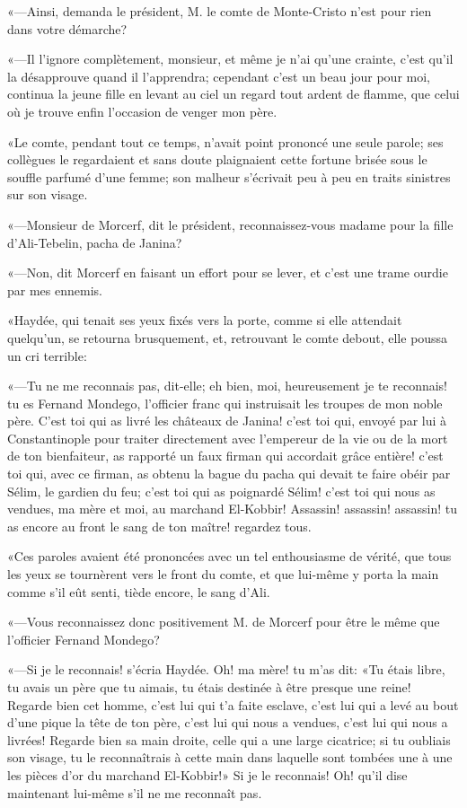 «—Ainsi, demanda le président, M. le comte de Monte-Cristo n'est pour rien dans votre démarche? 

«—Il l'ignore complètement, monsieur, et même je n'ai qu'une crainte, c'est qu'il la désapprouve quand il l'apprendra; cependant c'est un beau jour pour moi, continua la jeune fille en levant au ciel un regard tout ardent de flamme, que celui où je trouve enfin l'occasion de venger mon père. 

«Le comte, pendant tout ce temps, n'avait point prononcé une seule parole; ses collègues le regardaient et sans doute plaignaient cette fortune brisée sous le souffle parfumé d'une femme; son malheur s'écrivait peu à peu en traits sinistres sur son visage. 

«—Monsieur de Morcerf, dit le président, reconnaissez-vous madame pour la fille d'Ali-Tebelin, pacha de Janina? 

«—Non, dit Morcerf en faisant un effort pour se lever, et c'est une trame ourdie par mes ennemis. 

«Haydée, qui tenait ses yeux fixés vers la porte, comme si elle attendait quelqu'un, se retourna brusquement, et, retrouvant le comte debout, elle poussa un cri terrible: 

«—Tu ne me reconnais pas, dit-elle; eh bien, moi, heureusement je te reconnais! tu es Fernand Mondego, l'officier franc qui instruisait les troupes de mon noble père. C'est toi qui as livré les châteaux de Janina! c'est toi qui, envoyé par lui à Constantinople pour traiter directement avec l'empereur de la vie ou de la mort de ton bienfaiteur, as rapporté un faux firman qui accordait grâce entière! c'est toi qui, avec ce firman, as obtenu la bague du pacha qui devait te faire obéir par Sélim, le gardien du feu; c'est toi qui as poignardé Sélim! c'est toi qui nous as vendues, ma mère et moi, au marchand El-Kobbir! Assassin! assassin! assassin! tu as encore au front le sang de ton maître! regardez tous. 

«Ces paroles avaient été prononcées avec un tel enthousiasme de vérité, que tous les yeux se tournèrent vers le front du comte, et que lui-même y porta la main comme s'il eût senti, tiède encore, le sang d'Ali. 

«—Vous reconnaissez donc positivement M. de Morcerf pour être le même que l'officier Fernand Mondego? 

«—Si je le reconnais! s'écria Haydée. Oh! ma mère! tu m'as dit: «Tu étais libre, tu avais un père que tu aimais, tu étais destinée à être presque une reine! Regarde bien cet homme, c'est lui qui t'a faite esclave, c'est lui qui a levé au bout d'une pique la tête de ton père, c'est lui qui nous a vendues, c'est lui qui nous a livrées! Regarde bien sa main droite, celle qui a une large cicatrice; si tu oubliais son visage, tu le reconnaîtrais à cette main dans laquelle sont tombées une à une les pièces d'or du marchand El-Kobbir!» Si je le reconnais! Oh! qu'il dise maintenant lui-même s'il ne me reconnaît pas. 

